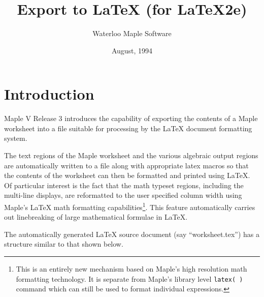 \documentclass{article}
\title{Export to \LaTeX{} (for \LaTeX{}2e)}
\author{Waterloo Maple Software}
\date{August, 1994}
\begin{document}
\maketitle

\section{Introduction}
Maple V Release 3 introduces the capability of exporting the 
contents of a Maple worksheet into a file suitable for processing 
by the \LaTeX{} document formatting system.

The text regions of the Maple worksheet and the various algebraic
output regions are automatically written to a file along with 
appropriate latex macros so that the contents of the worksheet 
can then be formatted and printed using \LaTeX{}.
Of particular interest is the fact that the math typeset
regions, including the multi-line displays, are reformatted
to the user specified column width using Maple's \LaTeX{} math formatting
capabilities\footnote{
This is an entirely new mechanism based on Maple's high resolution
math formatting technology. It is separate from Maple's library
level {\tt latex(~)} command which can still be used to format
individual expressions.}.  This feature automatically carries out
linebreaking of large mathematical formulae in \LaTeX{}.

The automatically generated \LaTeX{} source document (say ``worksheet.tex'') 
has a structure similar to that shown below.
\end{document}

